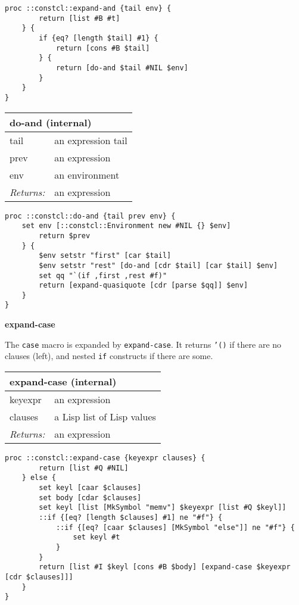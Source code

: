 \documentclass{report}
\begin{document}
\noindent\makebox[\linewidth]{\rule{\linewidth}{0.4pt}}
\begin{lstlisting}
proc ::constcl::expand-and {tail env} {
        return [list #B #t]
    } {
        if {eq? [length $tail] #1} {
            return [cons #B $tail]
        } {
            return [do-and $tail #NIL $env]
        }
    }
}
\end{lstlisting}
\noindent\makebox[\linewidth]{\rule{\linewidth}{0.4pt}}
\begin{tabular}{ |l l| }
\hline
\multicolumn{2}{|l|}{do-and (internal)} \\
\hline
tail & an expression tail \\
prev & an expression \\
env & an environment \\
\textit{Returns:} & an expression \\
\hline
\end{tabular}

\noindent\makebox[\linewidth]{\rule{\linewidth}{0.4pt}}
\begin{lstlisting}
proc ::constcl::do-and {tail prev env} {
    set env [::constcl::Environment new #NIL {} $env]
        return $prev
    } {
        $env setstr "first" [car $tail]
        $env setstr "rest" [do-and [cdr $tail] [car $tail] $env]
        set qq "`(if ,first ,rest #f)"
        return [expand-quasiquote [cdr [parse $qq]] $env]
    }
}
\end{lstlisting}
\noindent\makebox[\linewidth]{\rule{\linewidth}{0.4pt}}

\textbf{expand-case}


The \texttt{case} macro is expanded by \texttt{expand-case}. It returns \texttt{'()} if there are no clauses (left), and nested \texttt{if} constructs if there are some.

\begin{tabular}{ |l l| }
\hline
\multicolumn{2}{|l|}{expand-case (internal)} \\
\hline
keyexpr & an expression \\
clauses & a Lisp list of Lisp values \\
\textit{Returns:} & an expression \\
\hline
\end{tabular}

\noindent\makebox[\linewidth]{\rule{\linewidth}{0.4pt}}
\begin{lstlisting}
proc ::constcl::expand-case {keyexpr clauses} {
        return [list #Q #NIL]
    } else {
        set keyl [caar $clauses]
        set body [cdar $clauses]
        set keyl [list [MkSymbol "memv"] $keyexpr [list #Q $keyl]]
        ::if {[eq? [length $clauses] #1] ne "#f"} {
            ::if {[eq? [caar $clauses] [MkSymbol "else"]] ne "#f"} {
                set keyl #t
            }
        }
        return [list #I $keyl [cons #B $body] [expand-case $keyexpr [cdr $clauses]]]
    }
}
\end{lstlisting}
\noindent\makebox[\linewidth]{\rule{\linewidth}{0.4pt}}
\end{document}
